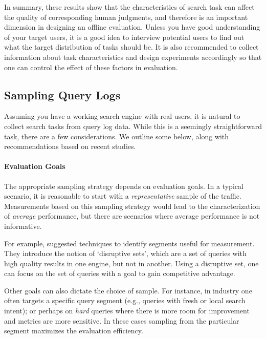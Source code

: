 In summary, these results show that the characteristics of search task can affect the quality of corresponding human judgments, and therefore is an important dimension in designing an offline evaluation. Unless you have good understanding of your target users, it is a good idea to interview potential users to find out what the target distribution of tasks should be. It is also recommended to collect information about task characteristics and design experiments accordingly so that one can control the effect of these factors in evaluation.

\subsection{Sampling Query Logs}
Assuming you have a working search engine with real users, it is natural to collect search tasks from query log data. While this is a seemingly straightforward task, there are a few considerations. We outline some below, along with recommendations based on recent studies.

\paragraph{Evaluation Goals} The appropriate sampling strategy depends on evaluation goals. In a typical scenario, it is reasonable to start with a \textit{representative} sample of the traffic. Measurements based on this sampling strategy would lead to the characterization of \textit{average} performance, but there are scenarios where average performance is not informative. 

For example, \cite{Zaragoza:2010} suggested techniques to identify segments useful for measurement. They introduce the notion of `disruptive sets', which are a set of queries with high quality results in one engine, but not in another. Using a disruptive set, one can focus on the set of queries with a goal to gain competitive advantage.

Other goals can also dictate the choice of sample. For instance, in industry one often targets a specific query segment (e.g., queries with fresh or local search intent); or perhaps on \textit{hard} queries where there is more room for improvement and metrics are more sensitive. In these cases sampling from the particular segment maximizes the evaluation efficiency.

